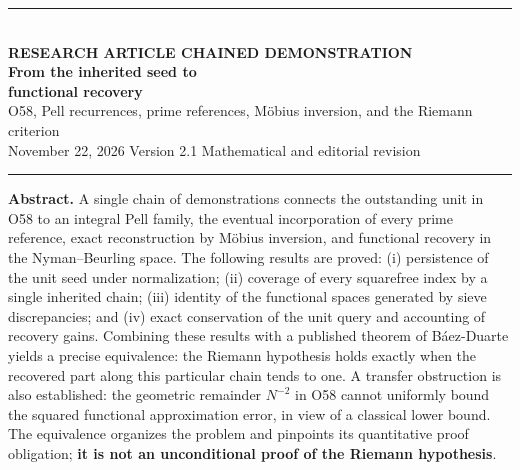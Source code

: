 \documentclass[11pt,a4paper]{article}
\theoremstyle{mine}
\theoremstyle{definition}
\begin{document}
\thispagestyle{empty}
\vspace*{8mm}
{\color{Copper}\rule{27mm}{1.7pt}}\\[14pt]
{\sffamily\small\bfseries\color{Copper} RESEARCH ARTICLE \;\textbar\; CHAINED DEMONSTRATION}\\[11pt]
{\fontsize{21}{25}\selectfont\bfseries\color{InkBlue}From the inherited seed to\\[3pt]functional recovery}\\[9pt]
{\fontsize{12.5}{17}\selectfont\color{Faint}O58, Pell recurrences, prime references, M\"obius inversion, and the Riemann criterion}\\[12pt]
{\small November 22, 2026 \;\textbar\; Version 2.1 \;\textbar\; Mathematical and editorial revision}\\[10pt]
\rule{\linewidth}{.55pt}
\vspace{3pt}
\textbf{Abstract.} A single chain of demonstrations connects the outstanding unit in O58 to an integral Pell family, the eventual incorporation of every prime reference, exact reconstruction by M\"obius inversion, and functional recovery in the Nyman--Beurling space. The following results are proved: (i) persistence of the unit seed under normalization; (ii) coverage of every squarefree index by a single inherited chain; (iii) identity of the functional spaces generated by sieve discrepancies; and (iv) exact conservation of the unit query and accounting of recovery gains. Combining these results with a published theorem of B\'aez-Duarte yields a precise equivalence: the Riemann hypothesis holds exactly when the recovered part along this particular chain tends to one. A transfer obstruction is also established: the geometric remainder $N^{-2}$ in O58 cannot uniformly bound the squared functional approximation error, in view of a classical lower bound. The equivalence organizes the problem and pinpoints its quantitative proof obligation; \textbf{it is not an unconditional proof of the Riemann hypothesis}.
\end{document}
